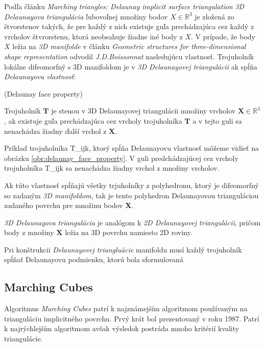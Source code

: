 Podľa článku \textit{Marching triangles: Delaunay implicit surface triangulation} \cite{hilton1997marching} 
\textit{3D Delaunayova triangulácia} ľubovoľnej množiny bodov $X\in \mathbb{R}^3$ je 
zložená zo štvorstenov takých, že pre každý z nich existuje guľa prechádzajúca cez každý z vrcholov 
štvrorstenu, ktorá neobsahuje žiadne iné body z $X$. V prípade, že body $X$ ležia na \textit{3D manifolde} 
v článku \textit{Geometric structures for three-dimensional shape representation} 
\cite{boissonnat1984geometric} odvodil \textit{J.D.Boissonnat} nasledujúcu vlastnosť. Trojuholník
lokálne difeomorfný s 3D manifoldom je v \textit{3D Delaunayovej triangulácii} ak spĺňa 
\textit{Delaunayovu vlastnosť}:

\begin{definition}
    (Delaunay face property)

    Trojuholník $\mathbf{T}$ je stenou v 3D Delaunayovej triangulácii množiny vrcholov 
    $\mathbf{X}\in \mathbb{R}^3$, ak existuje guľa prechádzajúca cez vrcholy trojuholníka 
    $\mathbf{T}$ a v tejto guli sa nenachádza žiadny ďalší vrchol z $\mathbf{X}$. 
\end{definition}

Príklad trojuholníka T_{ijk}, ktorý spĺňa Delaunayovu vlastnosť môžeme vidieť na obrázku 
\ref{obr:delaunay_face_property}. V guli predchádzajúcej cez vrcholy trojuholníka T_{ijk} 
sa nenachádza žiadny vrchol z množiny vrcholov.

Ak túto vlastnosť spĺňajú všetky trjuholníky z polyhedronu, ktorý je difeomorfný so zadaným 
\textit{3D manifoldom}, tak je tento polyhedron Delaunayovou trianguláciou zadaného povrchu pre 
množinu bodov $\mathbf{X}$.

\textit{3D Delaunayova triangulácia} je analógom k \textit{2D Delaunayovej triangulácii}, pričom
body z množiny $\mathbf{X}$ ležia na 3D povrchu namiesto 2D roviny.



Pri konštrukcii \textit{Delaunayovej triangluácie} manifoldu musí každý trojuholník spĺňať 
Delaunayovu podmienku, ktorú bola sformulovaná 



\subsection{Marching Cubes}

Algoritmus \textit{Marching Cubes} \cite{lorensen1987marching} patrí k najznámejším algoritmom používaným
na trianguláciu implicitného povrchu. Prvý krát bol prezentovaný v roku 1987. Patrí k najrýchlejším
algoritmom avšak výsledok postráda mnoho kritérií kvality triangulácie. 

